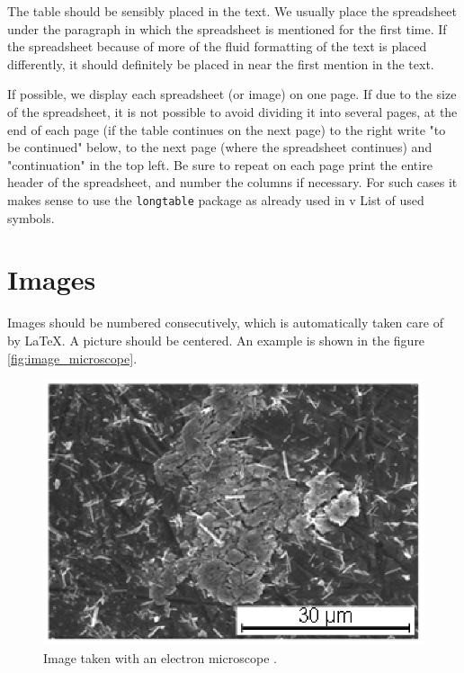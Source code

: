 The table should be sensibly placed in the text. We usually place the spreadsheet
under the paragraph in which the spreadsheet is mentioned for the first time. If the spreadsheet because of more
of the fluid formatting of the text is placed differently, it should definitely be placed in
near the first mention in the text.

If possible, we display each spreadsheet (or image) on one page. If
due to the size of the spreadsheet, it is not possible to avoid dividing it into several pages,
at the end of each page (if the table continues on the next page) to the right
write "to be continued" below, to the next page (where the spreadsheet
continues) and "continuation" in the top left. Be sure to repeat on each page
print the entire header of the spreadsheet, and number the columns if necessary. For such
cases it makes sense to use the \verb|longtable| package as already used in v
List of used symbols.

\section{Images}\label{sec:images}

Images should be numbered consecutively, which is automatically taken care of by \LaTeX. A picture
should be centered. An example is shown in the figure
\ref{fig:image_microscope}.

\begin{figure}[ht!]
\begin{centering}
\includegraphics[scale=1.0]{figures/slika_mikroskop}
\caption{Image taken with an electron microscope
\cite{stropnik_1997}.}
\label{fig:picture_microscope}
\end{centering}
\end{figure}

